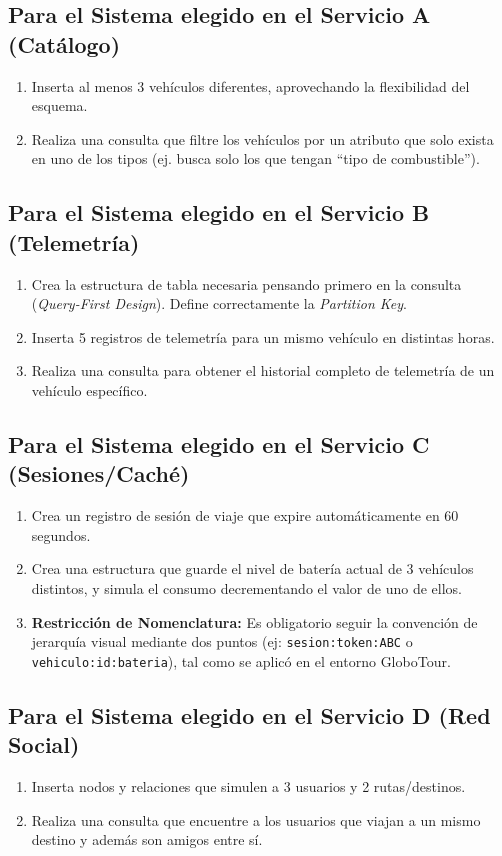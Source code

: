 \documentclass[12pt,a4paper]{article}
\begin{document}
\subsection*{Para el Sistema elegido en el Servicio A (Catálogo)}
\begin{enumerate}
    \item Inserta al menos 3 vehículos diferentes, aprovechando la flexibilidad del esquema.
    \item Realiza una consulta que filtre los vehículos por un atributo que solo exista en uno de los tipos (ej. busca solo los que tengan \enquote{tipo de combustible}).
\end{enumerate}

\subsection*{Para el Sistema elegido en el Servicio B (Telemetría)}
\begin{enumerate}
    \item Crea la estructura de tabla necesaria pensando primero en la consulta (\textit{Query-First Design}). Define correctamente la \textit{Partition Key}.
    \item Inserta 5 registros de telemetría para un mismo vehículo en distintas horas.
    \item Realiza una consulta para obtener el historial completo de telemetría de un vehículo específico.
\end{enumerate}

\subsection*{Para el Sistema elegido en el Servicio C (Sesiones/Caché)}
\begin{enumerate}
    \item Crea un registro de sesión de viaje que expire automáticamente en 60 segundos.
    \item Crea una estructura que guarde el nivel de batería actual de 3 vehículos distintos, y simula el consumo decrementando el valor de uno de ellos.
    \item \textbf{Restricción de Nomenclatura:} Es obligatorio seguir la convención de jerarquía visual mediante dos puntos (ej: \texttt{sesion:token:ABC} o \texttt{vehiculo:id:bateria}), tal como se aplicó en el entorno GloboTour.
\end{enumerate}

\subsection*{Para el Sistema elegido en el Servicio D (Red Social)}
\begin{enumerate}
    \item Inserta nodos y relaciones que simulen a 3 usuarios y 2 rutas/destinos.
    \item Realiza una consulta que encuentre a los usuarios que viajan a un mismo destino y además son amigos entre sí.
\end{enumerate}
\end{document}
